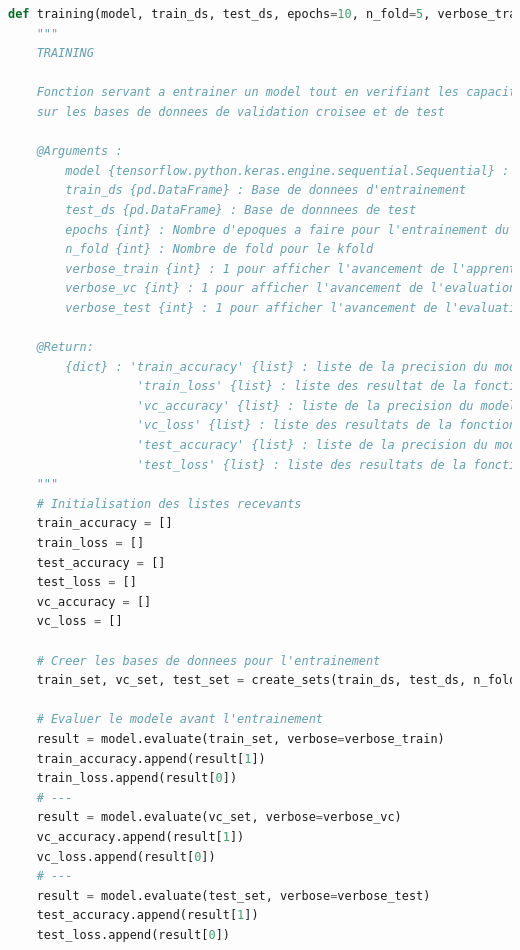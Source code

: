 \documentclass{article}
\begin{document}
\smallbreak
\begin{lstlisting}[language=Python, caption={Fonction pour l'entraînement du modèle}, label={code:training}]
def training(model, train_ds, test_ds, epochs=10, n_fold=5, verbose_train=1, verbose_vc=1, verbose_test=1):
    """
    TRAINING

    Fonction servant a entrainer un model tout en verifiant les capacites du modele
    sur les bases de donnees de validation croisee et de test

    @Arguments :
        model {tensorflow.python.keras.engine.sequential.Sequential} : Modele tensorflow a entrainer
        train_ds {pd.DataFrame} : Base de donnees d'entrainement
        test_ds {pd.DataFrame} : Base de donnnees de test
        epochs {int} : Nombre d'epoques a faire pour l'entrainement du model
        n_fold {int} : Nombre de fold pour le kfold
        verbose_train {int} : 1 pour afficher l'avancement de l'apprentissage, 0 aucun affichage
        verbose_vc {int} : 1 pour afficher l'avancement de l'evaluation, 0 aucun affichage
        verbose_test {int} : 1 pour afficher l'avancement de l'evaluation, 0 aucun affichage

    @Return:
        {dict} : 'train_accuracy' {list} : liste de la precision du modele sur la base de donnees d'entrainement
                  'train_loss' {list} : liste des resultat de la fonction de perte du modele sur la base de donnees d'entrainement
                  'vc_accuracy' {list} : liste de la precision du modele sur la base de donnees de validation croisee
                  'vc_loss' {list} : liste des resultats de la fonction de perte du modele sur la base de donnees de validation croisee
                  'test_accuracy' {list} : liste de la precision du modele sur la base de donnees de test
                  'test_loss' {list} : liste des resultats de la fonction de perte du modele sur la base de donnees de test
    """
    # Initialisation des listes recevants
    train_accuracy = []
    train_loss = []
    test_accuracy = []
    test_loss = []
    vc_accuracy = []
    vc_loss = []

    # Creer les bases de donnees pour l'entrainement
    train_set, vc_set, test_set = create_sets(train_ds, test_ds, n_fold)

    # Evaluer le modele avant l'entrainement
    result = model.evaluate(train_set, verbose=verbose_train)
    train_accuracy.append(result[1])
    train_loss.append(result[0])
    # ---
    result = model.evaluate(vc_set, verbose=verbose_vc)
    vc_accuracy.append(result[1])
    vc_loss.append(result[0])
    # ---
    result = model.evaluate(test_set, verbose=verbose_test)
    test_accuracy.append(result[1])
    test_loss.append(result[0])


\end{lstlisting}
\end{document}
